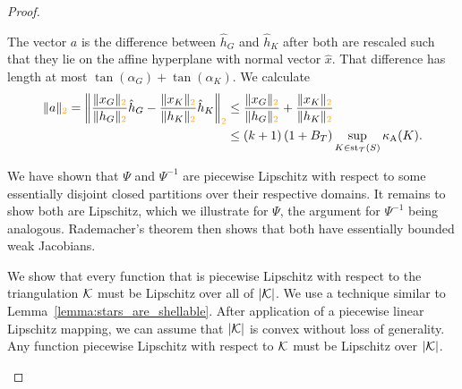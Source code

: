 \documentclass[10pt,letterpaper]{article}
\newcommand\cye[1]{%
  \protect\leavevmode
  \begingroup
    \color{red!35!yellow}%
    #1%
  \endgroup
}
\begin{document}
\begin{proof}
\begin{itemize}
        The vector $a$ is the difference between $\hat h_{G}$ and $\hat h_{K}$ after both are rescaled such that they lie on the affine hyperplane with normal vector $\hat x$. That difference has length at most $\tan(\alpha_{G}) + \tan(\alpha_{K})$.
        We calculate 
        \begin{align*}
            \|a\|_{\cye{2}}
            = 
            \left\|
            \frac{\|x_{G}\|_{\cye{2}}}{\|h_{G}\|_{\cye{2}}} \hat h_{{G}} 
            - 
            \frac{\|x_{K}\|_{\cye{2}}}{\|h_{K}\|_{\cye{2}}} \hat h_K
            \right\|_{\cye{2}}
            &
            \leq 
            \frac{\|x_{G}\|_{\cye{2}}}{\|h_{G}\|_{\cye{2}}} 
            + 
            \frac{\|x_{K}\|_{\cye{2}}}{\|h_{K}\|_{\cye{2}}} 
            \\&
            \leq 
            (k+1) 
            \left( 1 + B_{T} \right)
            \sup_{ K \in \patch_{\calT}(S) }
            \kappa_{\maxcol}(K) %
            .
        \end{align*}
        
        We have shown that $\Psi$ and $\Psi^{-1}$ are piecewise Lipschitz with respect to some essentially disjoint closed partitions over their respective domains.
        It remains to show both are Lipschitz, which we illustrate for $\Psi$, the argument for $\Psi^{-1}$ being analogous. 
        Rademacher's theorem then shows that both have essentially bounded weak Jacobians. 
        
        We show that every function that is piecewise Lipschitz with respect to the triangulation ${\mathcal K}$ must be Lipschitz over all of $|{\mathcal K}|$. 
        We use a technique similar to Lemma~\ref{lemma:stars_are_shellable}. 
        After application of a piecewise linear Lipschitz mapping, 
        we can assume that $|{\mathcal K}|$ is convex without loss of generality. 
        Any function piecewise Lipschitz with respect to ${\mathcal K}$ must be Lipschitz over $|{\mathcal K}|$. 
        
        
        

\end{itemize}
\end{proof}
\end{document}
